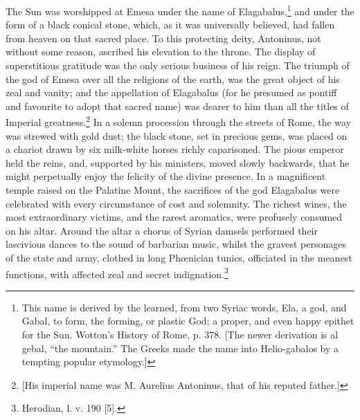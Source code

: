 The Sun was worshipped at Emesa under the name of Elagabalus,\footnote{This name is derived by the learned, from two Syriac words, Ela, a god, and Gabal, to form, the forming, or plastic God; a proper, and even happy epithet for the Sun. Wotton\texthebrew{}’s History of Rome, p. 378. [The newer derivation is al gebal, \texthebrew{“}the mountain.\texthebrew{}” The Greeks made the name into Helio-gabalos by a tempting popular etymology.]} and under the form of a black conical stone, which, as it was universally believed, had fallen from heaven on that sacred place. To this protecting deity, Antoninus, not without some reason, ascribed his elevation to the throne. The display of superstitious gratitude was the only serious business of his reign. The triumph of the god of Emesa over all the religions of the earth, was the great object of his zeal and vanity; and the appellation of Elagabalus (for he presumed as pontiff and favourite to adopt that sacred name) was dearer to him than all the titles of Imperial greatness.\footnote{[His imperial name was M. Aurelius Antoninus, that of his reputed father.]} In a solemn procession through the streets of Rome, the way was strewed with gold dust; the black stone, set in precious gems, was placed on a chariot drawn by six milk-white horses richly caparisoned. The pious emperor held the reins, and, supported by his ministers, moved slowly backwards, that he might perpetually enjoy the felicity of the divine presence. In a magnificent temple raised on the Palatine Mount, the sacrifices of the god Elagabalus were celebrated with every circumstance of cost and solemnity. The richest wines, the most extraordinary victims, and the rarest aromatics, were profusely consumed on his altar. Around the altar a chorus of Syrian damsels performed their lascivious dances to the sound of barbarian music, whilst the gravest personages of the state and army, clothed in long Phœnician tunics, officiated in the meanest functions, with affected zeal and secret indignation.\footnote{Herodian, l. v. 190 [5].}

